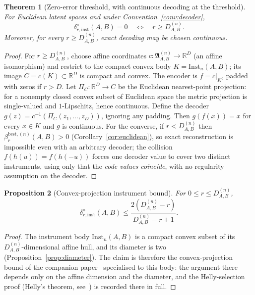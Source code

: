 \documentclass[11pt,a4paper]{article}
\newtheorem{theorem}{Theorem}[section]
\newtheorem{proposition}[theorem]{Proposition}
\newcommand{\Inst}{\mathrm{Inst}}
\begin{document}
\begin{theorem}[Zero-error threshold, with continuous decoding at the threshold]
\label{thm:zero-error}
For Euclidean latent spaces and under Convention~\ref{conv:decoder},
\[
\delta_{r,\mathrm{inst}}^{\diamond}(A,B)=0
\quad\Longleftrightarrow\quad
r\ge D_{A,B}^{(n)}.
\]
Moreover, for every $r\ge D_{A,B}^{(n)}$, exact decoding may be chosen continuous.
\end{theorem}

\begin{proof}
For $r\ge D_{A,B}^{(n)}$, choose affine coordinates $c:\mathfrak A_{A,B}^{(n)}\to\mathbb R^{D}$ (an affine isomorphism) and restrict to the compact convex body $K=\Inst_n(A,B)$; its image $C=c(K)\subset\mathbb R^{D}$ is compact and convex. The encoder is $f=c|_K$, padded with zeros if $r>D$. Let $\Pi_C:\mathbb R^{D}\to C$ be the Euclidean nearest-point projection: for a nonempty closed convex subset of Euclidean space the metric projection is single-valued and $1$-Lipschitz, hence continuous. Define the decoder $g(z)=c^{-1}(\Pi_C(z_1,\dots,z_D))$, ignoring any padding. Then $g(f(x))=x$ for every $x\in K$ and $g$ is continuous. For the converse, if $r<D_{A,B}^{(n)}$ then $\beta_r^{\mathrm{best},(n)}(A,B)>0$ (Corollary~\ref{cor:euclidean}), so exact reconstruction is impossible even with an arbitrary decoder; the collision $f(h(u))=f(h(-u))$ forces one decoder value to cover two distinct instruments, using only that the \emph{code values coincide}, with no regularity assumption on the decoder.
\end{proof}

\begin{proposition}[Convex-projection instrument bound]
\label{prop:convex}
For $0\le r\le D_{A,B}^{(n)}$,
\[
\delta_{r,\mathrm{inst}}^{\diamond}(A,B)
\le\frac{2(D_{A,B}^{(n)}-r)}{D_{A,B}^{(n)}-r+1}.
\]
\end{proposition}

\begin{proof}
The instrument body $\Inst_n(A,B)$ is a compact convex subset of its $D_{A,B}^{(n)}$-dimensional affine hull, and its diameter is two (Proposition~\ref{prop:diameter}). The claim is therefore the convex-projection bound of the companion paper~\cite{CompanionChannels} specialised to this body: the argument there depends only on the affine dimension and the diameter, and the Helly-selection proof (Helly's theorem, see~\cite{Barvinok2002}) is recorded there in full.
\end{proof}
\end{document}
